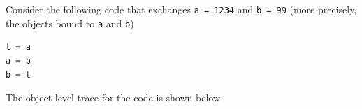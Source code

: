\documentclass[8pt,a4paper,compress]{beamer}
\begin{document}
\begin{frame}[fragile]
Consider the following code that exchanges \lstinline{a = 1234} and \lstinline{b = 99} (more precisely, the objects bound to \lstinline{a} and \lstinline{b})

\smallskip

\begin{lstlisting}[language=Python,style=focusin]
t = a
a = b
b = t
\end{lstlisting}

\pause
\bigskip

The object-level trace for the code is shown below
\begin{center}
\end{center}
\end{frame}
\end{document}
